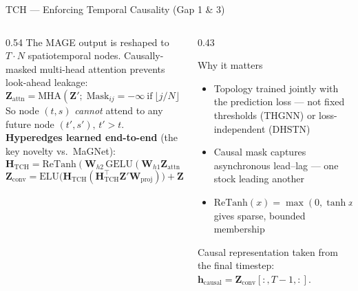 \documentclass[aspectratio=169, 10pt]{beamer}
\newcommand{\myvec}[1]{\mathbf{#1}}
\begin{document}
\begin{frame}{TCH — Enforcing Temporal Causality (Gap 1 \& 3)}
  \begin{columns}[T]
    \begin{column}{0.54\textwidth}
      The MAGE output is reshaped to $T{\cdot}N$ spatiotemporal nodes.
      \alert{Causally-masked} multi-head attention prevents look-ahead leakage:
      \[ \myvec{Z}_\text{attn}=\text{MHA}(\myvec{Z}';\;
         \text{Mask}_{ij}=-\infty\ \text{if}\ \lfloor j/N\rfloor>\lfloor i/N\rfloor) \]
      So node $(t,s)$ \emph{cannot} attend to any future node $(t',s'),\,t'>t$.
      \smallskip
      \textbf{Hyperedges learned end-to-end} (the key novelty vs.\ MaGNet):
      \[ \myvec{H}_\text{TCH}=\text{ReTanh}(\myvec{W}_{h2}\,\text{GELU}(\myvec{W}_{h1}\myvec{Z}_\text{attn}))\in\mathbb{R}^{TN\times M_1} \]
      \[ \myvec{Z}_\text{conv}=\text{ELU}\!\big(\myvec{H}_\text{TCH}(\myvec{H}_\text{TCH}^\top\myvec{Z}'\myvec{W}_\text{proj})\big)+\myvec{Z}_\text{attn} \]
    \end{column}
    \begin{column}{0.43\textwidth}
      \begin{block}{Why it matters}
        \begin{itemize}\setlength{\itemsep}{3pt}
          \item Topology trained \alert{jointly} with the prediction loss — not fixed thresholds (THGNN) or
                loss-independent (DHSTN)
          \item Causal mask captures \alert{asynchronous lead--lag} — one stock leading another
          \item $\text{ReTanh}(x){=}\max(0,\tanh x)$ gives sparse, bounded membership
        \end{itemize}
      \end{block}
      \footnotesize Causal representation taken from the final timestep: $\myvec{h}_\text{causal}=\myvec{Z}_\text{conv}[:,T{-}1,:]$.
    \end{column}
  \end{columns}
\end{frame}
\end{document}
